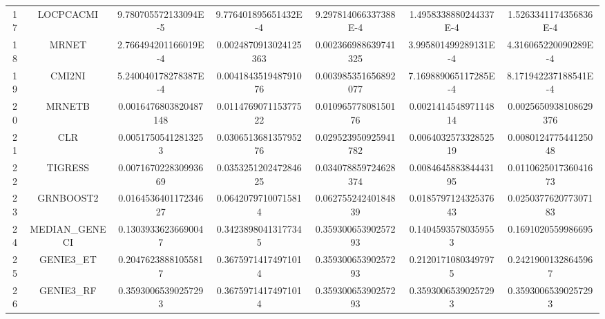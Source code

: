 \documentclass[a4paper,10pt]{article}
\begin{document}
\begin{landscape}
\begin{table}[!htp]
\begin{tabular}{ccccccc}
17&LOCPCACMI&9.780705572133094E-5&9.776401895651432E-4&9.297814066337388E-4&1.4958338880244337E-4&1.5263341174356836E-4\\
18&MRNET&2.766494201166019E-4&0.0024870913024125363&0.002366988639741325&3.995801499289131E-4&4.316065220090289E-4\\
19&CMI2NI&5.240040178278387E-4&0.004184351948791076&0.003985351656892077&7.169889065117285E-4&8.171942237188541E-4\\
20&MRNETB&0.0016476803820487148&0.011476907115377522&0.01096577808150176&0.002141454897114814&0.0025650938108629376\\
21&CLR&0.00517505412813253&0.030651368135795276&0.029523950925941782&0.006403257332852519&0.008012477544125048\\
22&TIGRESS&0.007167022830993669&0.035325120247284625&0.034078859724628374&0.008464588384443195&0.011062501736041673\\
23&GRNBOOST2&0.016453640117234627&0.06420797100715814&0.06275524240184839&0.018579712432537643&0.025037762077307183\\
24&MEDIAN_GENECI&0.13039336236690047&0.34238980413177345&0.35930065390257293&0.14045935780359553&0.1691020559986695\\
25&GENIE3_ET&0.20476238881055817&0.36759714174971014&0.35930065390257293&0.21201710803497975&0.24219001328645967\\
26&GENIE3_RF&0.35930065390257293&0.36759714174971014&0.35930065390257293&0.35930065390257293&0.35930065390257293\\
\hline
\end{tabular}
\end{table}


\newpage


\end{landscape}
\end{document}
